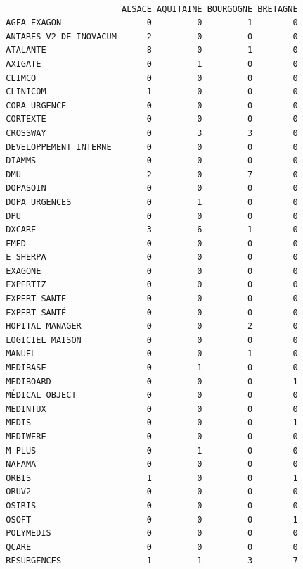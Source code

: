 \documentclass[]{article}
\begin{document}
\begin{verbatim}
                        
                         ALSACE AQUITAINE BOURGOGNE BRETAGNE
  AGFA EXAGON                 0         0         1        0
  ANTARES V2 DE INOVACUM      2         0         0        0
  ATALANTE                    8         0         1        0
  AXIGATE                     0         1         0        0
  CLIMCO                      0         0         0        0
  CLINICOM                    1         0         0        0
  CORA URGENCE                0         0         0        0
  CORTEXTE                    0         0         0        0
  CROSSWAY                    0         3         3        0
  DEVELOPPEMENT INTERNE       0         0         0        0
  DIAMMS                      0         0         0        0
  DMU                         2         0         7        0
  DOPASOIN                    0         0         0        0
  DOPA URGENCES               0         1         0        0
  DPU                         0         0         0        0
  DXCARE                      3         6         1        0
  EMED                        0         0         0        0
  E SHERPA                    0         0         0        0
  EXAGONE                     0         0         0        0
  EXPERTIZ                    0         0         0        0
  EXPERT SANTE                0         0         0        0
  EXPERT SANTÉ                0         0         0        0
  HOPITAL MANAGER             0         0         2        0
  LOGICIEL MAISON             0         0         0        0
  MANUEL                      0         0         1        0
  MEDIBASE                    0         1         0        0
  MEDIBOARD                   0         0         0        1
  MÉDICAL OBJECT              0         0         0        0
  MEDINTUX                    0         0         0        0
  MEDIS                       0         0         0        1
  MEDIWERE                    0         0         0        0
  M-PLUS                      0         1         0        0
  NAFAMA                      0         0         0        0
  ORBIS                       1         0         0        1
  ORUV2                       0         0         0        0
  OSIRIS                      0         0         0        0
  OSOFT                       0         0         0        1
  POLYMEDIS                   0         0         0        0
  QCARE                       0         0         0        0
  RESURGENCES                 1         1         3        7

\end{verbatim}
\end{document}
